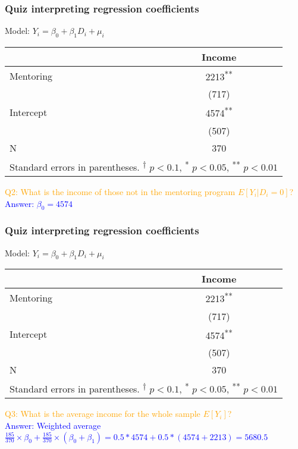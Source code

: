 \documentclass[12pt,english,dvipsnames,aspectratio=169,handout]{beamer}\usepackage[]{graphicx}\usepackage[]{xcolor}
\begin{document}
\begin{frame}
	\frametitle{Quiz interpreting regression coefficients}
\centering
\tiny
Model: ${Y}_i = \beta_0 + \beta_1 {D}_i + \mu_i$

\scriptsize
\begin{tabular}{l*{1}{c}}
\toprule
          &\multicolumn{1}{c}{Income}\\
\midrule
Mentoring     &     2213\textsuperscript{**}\\
          &    (717)        \\
Intercept    &     4574\textsuperscript{**}\\
          &    (507)        \\
\midrule
N         &      370        \\
\bottomrule
\multicolumn{2}{l}{Standard errors in parentheses. \textsuperscript{†} \(p<0.1\), \textsuperscript{*} \(p<0.05\), \textsuperscript{**} \(p<0.01\)}\\
\end{tabular}
\footnotesize\flushleft

\textcolor{orange}{Q2: What is the income of those not in the mentoring program $E[Y_i|D_i=0]$?}\\
\textcolor{blue}{Answer: $\beta_0 = 4574$}

\end{frame}



\begin{frame}
	\frametitle{Quiz interpreting regression coefficients}
\centering
\tiny
Model: ${Y}_i = \beta_0 + \beta_1 {D}_i + \mu_i$

\scriptsize
\begin{tabular}{l*{1}{c}}
\toprule
          &\multicolumn{1}{c}{Income}\\
\midrule
Mentoring     &     2213\textsuperscript{**}\\
          &    (717)        \\
Intercept    &     4574\textsuperscript{**}\\
          &    (507)        \\
\midrule
N         &      370        \\
\bottomrule
\multicolumn{2}{l}{Standard errors in parentheses. \textsuperscript{†} \(p<0.1\), \textsuperscript{*} \(p<0.05\), \textsuperscript{**} \(p<0.01\)}\\
\end{tabular}
\footnotesize\flushleft

\textcolor{orange}{Q3: What is the average income for the whole sample $E[Y_i]$?}\\
\textcolor{blue}{Answer: Weighted average $\frac{185}{370}\times \beta_0 + \frac{185}{370}\times (\beta_0 + \beta_1) = 0.5*4574+0.5*(4574 + 2213)=5680.5$}

\end{frame}
\end{document}
